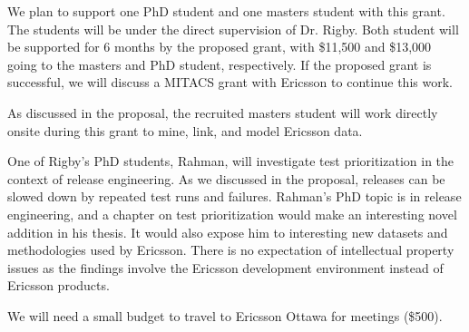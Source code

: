 \documentclass[12pt, letterpaper]{article}
\begin{document}
\fancyhead{}
\pagestyle{fancy}
\renewcommand{\headrulewidth}{0pt}

\begin{center}
\begin{LARGE}
\noindent
{}
\end{LARGE}
\end{center}


We plan to support one PhD student and one masters student with this grant.
The students will be under the direct supervision of Dr. Rigby. 
%
Both student will be supported for 6 months by the proposed grant, with
\$11,500 and \$13,000 going to the masters and PhD student, respectively. If
the proposed grant is successful, we will discuss a MITACS grant with Ericsson
to continue this work.

As discussed in the proposal, the recruited masters student will work
directly onsite during this grant to mine, link, and model Ericsson data.

One of Rigby's PhD students, Rahman, will investigate test prioritization in
the context of release engineering. As we discussed in the proposal, releases
can be slowed down by repeated test runs and failures. Rahman's PhD topic is in
release engineering, and a chapter on test prioritization would make an
interesting novel addition in his thesis. It would also expose him to
interesting new datasets and methodologies used by Ericsson. There is no
expectation of intellectual property issues as the findings involve the
Ericsson development environment instead of Ericsson products.

We will need a small budget to travel to Ericsson Ottawa for meetings (\$500).
\end{document}

